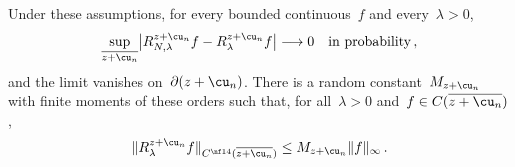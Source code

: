 \documentclass[11pt]{amsart}
\begin{document}
\begin{proposition}
\label{mfd:prop-uniform-resolvent}
Under these assumptions, for every bounded continuous~$f$ and every~$\lambda>0$,
\begin{equation}
	\sup_{\overline{z+\cu_n}}\bigl|R^{z+\cu_n}_{N,\lambda}f-R^{z+\cu_n}_\lambda f\bigr|\longrightarrow0
	\quad\text{in probability}\,,
	\label{eq:mfd-42}
\end{equation}
and the limit vanishes on~$\partial(z+\cu_n)$. There is a random constant~$M_{z+\cu_n}$ with finite moments of these orders such that, for all~$\lambda>0$ and~$f\in C(\overline{z+\cu_n})$,
\begin{equation}
	\|R^{z+\cu_n}_\lambda f\|_{C^{\nf14}(\overline{z+\cu_n})}\leq M_{z+\cu_n}\|f\|_\infty\,.
	\label{eq:mfd-uniform-lambda}
\end{equation}
\end{proposition}
\end{document}
